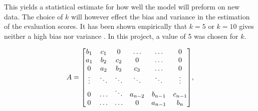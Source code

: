 This yields a statistical estimate for how well the model will preform on new data. The choice of $k$ will however effect the bias and variance in the estimation of the evaluation scores. It has been shown empirically that $k=5$ or $k=10$ gives neither a high bias nor variance \citep{james2013introduction}. In this project, a value of 5 was chosen for $k$. 


\[A =
\mqty[b_1 & c_1 & 0 & \hdots & \hdots & 0 \\
a_1 & b_2 & c_2 & 0 & \hdots & 0 \\
0 & a_2 & b_3 & c_3 & \hdots & 0 \\
\vdots & \ddots & \ddots & \ddots & \ddots & \vdots \\
0 & \hdots & \ddots & a_{n-2} & b_{n-1} & c_{n-1} \\
0 & \hdots & \hdots & 0 & a_{n-1} & b_n],
\]